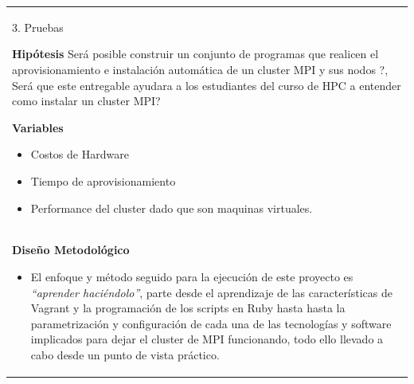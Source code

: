 \documentclass[letter,12pt]{article}
\begin{document}
\begin{center}
\begin{tabular}{|p{15.5cm}|}
\hline    
        
        3. Pruebas
  
    \textbf{Hipótesis}
    Será posible construir un conjunto de programas que realicen el aprovisionamiento e instalación automática de un cluster MPI y sus nodos ?, Será que este entregable ayudara a los estudiantes del curso de HPC a entender como instalar un cluster MPI?
    \par
    
    \textbf{Variables}
    \begin{itemize}
        \item Costos de Hardware
        \item Tiempo de aprovisionamiento
        \item Performance del cluster dado que son maquinas virtuales.
    \end{itemize} \\

    
    \textbf{Diseño Metodológico}
    \begin{itemize}
        \item 

  El enfoque y método seguido para la ejecución de este proyecto es \textit{“aprender haciéndolo”}, parte desde el aprendizaje de las características de Vagrant y la programación de los scripts en Ruby hasta hasta la parametrización y configuración de cada una de las tecnologías y software implicados para dejar el cluster de MPI funcionando, todo ello llevado a cabo desde un punto de vista práctico.
        
        
    \end{itemize}\\  
        
\hline
\end{tabular}
\end{center}
\end{document}
